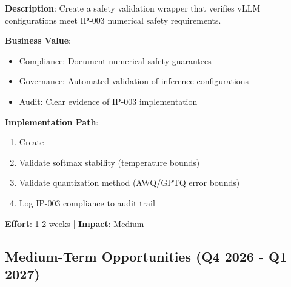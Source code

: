 \begin{tcolorbox}[colback=blue!5,colframe=blue!70,title=\faIcon{shield-alt} Opportunity: vLLM Safety Validator (IP-003)]
\textbf{Description}: Create a safety validation wrapper that verifies vLLM configurations meet IP-003 numerical safety requirements.

\textbf{Business Value}:
\begin{itemize}[nosep]
    \item Compliance: Document numerical safety guarantees
    \item Governance: Automated validation of inference configurations
    \item Audit: Clear evidence of IP-003 implementation
\end{itemize}

\textbf{Implementation Path}:
\begin{enumerate}[nosep]
    \item Create 
    \item Validate softmax stability (temperature bounds)
    \item Validate quantization method (AWQ/GPTQ error bounds)
    \item Log IP-003 compliance to audit trail
\end{enumerate}

\textbf{Effort}: 1-2 weeks | \textbf{Impact}: Medium
\end{tcolorbox}

\subsection{Medium-Term Opportunities (Q4 2026 - Q1 2027)}


